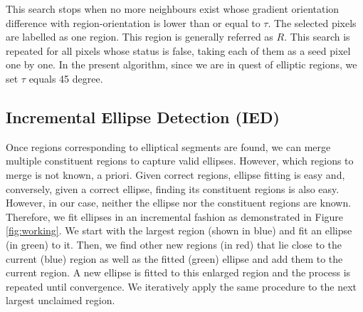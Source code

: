 \documentclass[preprint]{iucr}              %
\begin{document}
This search stops when no more neighbours exist whose gradient orientation difference with region-orientation is lower than or equal to $\tau$. The selected pixels are labelled as one region. This region is generally referred as $R$. This search is repeated for all pixels whose status is false, taking each of them as a seed pixel one by one. In the present algorithm, since we are in quest of elliptic regions, we set $\tau$ equals 45 degree. 

\subsection{Incremental Ellipse Detection (IED)} \label{subsec:EllipseGrow}
Once regions corresponding to elliptical segments are found, we can merge multiple constituent regions to capture valid ellipses. However, which regions to merge is not known, a priori. Given correct regions, ellipse fitting is easy and, conversely, given a correct ellipse, finding its constituent regions is also easy. However, in our case, neither the ellipse nor the constituent regions are known. Therefore, we fit ellipses in an incremental fashion as demonstrated in Figure \ref{fig:working}. We start with the largest region (shown in blue) and fit an ellipse (in green) to it. Then, we find other new regions (in red) that lie close to the current (blue) region as well as the fitted (green) ellipse and add them to the current region. A new ellipse is fitted to this enlarged region and the process is repeated until convergence. We iteratively apply the same procedure to the next largest unclaimed region.
\end{document}
